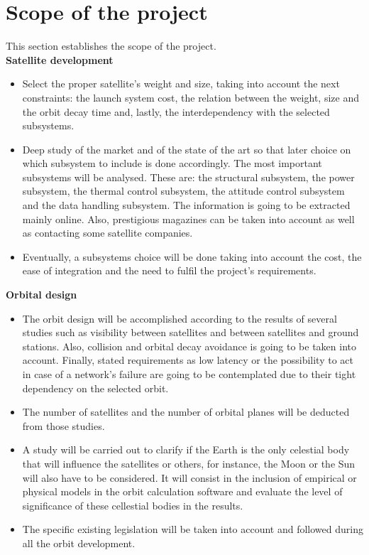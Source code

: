 \section{Scope of the project}
This section establishes the scope of the project. \\

{\bfseries Satellite development} 
\begin{itemize}
	\item Select the proper satellite’s weight and size, taking into account the next constraints: the launch system cost, the relation between the weight, size and the orbit decay time and, lastly, the interdependency with the selected subsystems.
	\item Deep study of the market and of the state of the art so that later choice on which subsystem to include is done accordingly. The most important subsystems will be analysed. These are: the structural subsystem, the power subsystem, the thermal control subsystem, the attitude control subsystem and the data handling subsystem. The information is going to be extracted mainly online. Also, prestigious magazines can be taken into account as well as contacting some satellite companies.  
	\item Eventually, a subsystems choice will be done taking into account the cost, the ease of integration and the need to fulfil the project’s requirements.
\end{itemize}

{\bfseries Orbital design}

\begin{itemize}
	\item The orbit design will be accomplished according to the results of several studies such
as visibility between satellites and between satellites and ground stations. Also, collision
and orbital decay avoidance is going to be taken into account. Finally, stated requirements as low latency or the possibility to act in case of a network’s failure are going to be contemplated due to their tight dependency on the selected orbit.
	\item The number of satellites and the number of orbital planes will be deducted from those
studies.
	\item A study will be carried out to clarify if the Earth is the only celestial body that will
influence the satellites or others, for instance, the Moon or the Sun will also have to
be considered. It will consist in the inclusion of empirical or physical models in the orbit calculation software and evaluate the level of significance of these cellestial bodies in the results. 
	\item The specific existing legislation will be taken into  account and followed during all
the orbit development.

\end{itemize}

